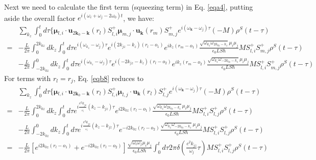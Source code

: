 \documentclass[aps,showpacs,twocolumn,twoside,groupedaddress]{revtex4}
\let\vec\bm
\begin{document}
\begin{widetext}
Next we need to calculate the first term (squeezing term) in Eq. \eqref{eqa4}, putting aside the overall factor $e^{i(\omega_i+\omega_j-2\omega_0)t}$, we have:
\begin{equation}
\label{eqb8}\tag{A7}
\begin{split}
& \underset{k_{z}}{\sum}\int_{0}^{t}d\tau\{\vec{\mu}{}_{l,i}\cdot\vec{u}_{2\vec{k}_{0}-\vec{k}}(r_{l})S_{l,i}^{+}\vec{\mu}_{m,j}\cdot\vec{u}_{\vec{k}}(r_{m})S_{m,j}^{+}e^{i(\omega_{\vec{k}}-\omega_{j})\tau}(-M)\rho^{S}(t-\tau)\\
=&-\frac{L}{2\pi}\int_{0}^{2k_{0z}}dk_{z}\int_{0}^{t}d\tau e^{i(\omega_{k_{z}}-\omega_{j})\tau}e^{i(2k_{jz}-k_{z})(r_{l}-o_{1})}e^{ik_{z}(r_{m}-o_{1})}\frac{\sqrt{\omega_{k_{z}}\omega_{2k_{0z}-k_{z}}}\mu_{i}\mu_{j}}{\epsilon_{0}LS\hbar}MS_{l,i}^{+}S_{m,j}^{+}\rho^{S}(t-\tau)\\ 
&-\frac{L}{2\pi}\int_{-2k_{0z}}^{0}dk_{z}\int_{0}^{t}d\tau e^{i(\omega_{k_{z}}-\omega_{j})\tau}e^{i(-2k_{jz}-k_{z})(r_{l}-o_{2})}e^{ik_{z}(r_{m}-o_{2})}\frac{\sqrt{\omega_{k_{z}}\omega_{-2k_{0z}-k_{z}}}\mu_{i}\mu_{j}}{\epsilon_{0}LS\hbar}M S_{l,i}^{+}S_{m,j}^{+}\rho^{S}(t-\tau)
\end{split}
\end{equation}
For terms with $r_l=r_j$, Eq.  \eqref{eqb8} reduces to 
\begin{equation}
\label{eqb9}\tag{A8}
\begin{split}
&\underset{k_{z}}{\sum}\int_{0}^{t}d\tau\{\vec{\mu}{}_{l,i}\cdot\vec{u}_{2\vec{k}_{0}-\vec{k}}(r_{l})S_{l,i}^{+}\vec{\mu}_{l,j}\cdot\vec{u}_{\vec{k}}(r_{l})S_{l,j}^{+}e^{i(\omega_{\vec{k}}-\omega_{j})\tau}(-M)\rho^{S}(t-\tau)\\
=&-\frac{L}{2\pi}\int_{0}^{2k_{0z}}dk_{z}\int_{0}^{t}d\tau e^{i\frac{c^{2}k_{jz}}{_{\omega_{j}}}(k_{z}-k_{jz})\tau}e^{i2k_{0z}(r_{l}-o_{1})}\frac{\sqrt{\omega_{k_{z}}\omega_{2k_{0z}-k_{z}}}\mu_{i}\mu_{j}}{\epsilon_{0}LS\hbar}M S_{l,i}^{+}S_{l,j}^{+}\rho^{S}(t-\tau)\\
&-\frac{L}{2\pi}\int_{-2k_{0z}}^{0}dk_{z}\int_{0}^{t}d\tau e^{i\frac{c^{2}k_{jz}}{_{\omega_{j}}}(k_{z}-k_{jz})\tau}e^{-i2k_{0z}(r_{l}-o_{2})}\frac{\sqrt{\omega_{k_{z}}\omega_{-2k_{0z}-k_{z}}}\mu_{i}\mu_{j}}{\epsilon_{0}LS\hbar}M S_{l,i}^{+}S_{l,j}^{+}\rho^{S}(t-\tau)\\
=&-\frac{L}{2\pi}[e^{i2k_{0z}(r_{l}-o_{1})}+e^{-i2k_{0z}(r_{l}-o_{2})}]\frac{\sqrt{\omega_{i}\omega_{j}}\mu_{i}\mu_{j}}{\epsilon_{0}LS\hbar}\int_{0}^{t}d\tau2\pi\delta(\frac{c^{2}k_{jz}}{\omega_{j}}\tau)M S_{l,i}^{+}S_{l,j}^{+}\rho^{S}(t-\tau)\\

\end{split}
\end{equation}
\end{widetext}
\end{document}
